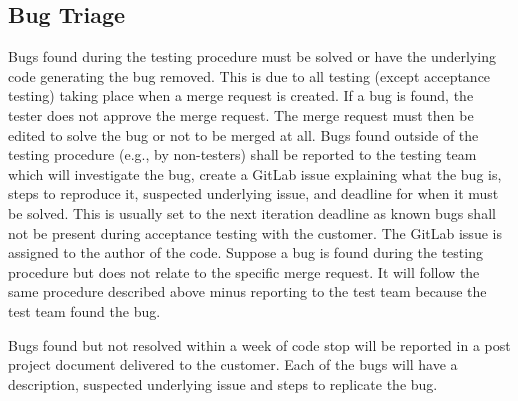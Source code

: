 \subsection{Bug Triage}
Bugs found during the testing procedure must be solved or have the underlying code generating the bug removed. This is due to all testing (except acceptance testing) taking place when a merge request is created. If a bug is found, the tester does not approve the merge request. The merge request must then be edited to solve the bug or not to be merged at all. Bugs found outside of the testing procedure (e.g., by non-testers) shall be reported to the testing team which will investigate the bug, create a GitLab issue explaining what the bug is, steps to reproduce it, suspected underlying issue, and deadline for when it must be solved. This is usually set to the next iteration deadline as known bugs shall not be present during acceptance testing with the customer. The GitLab issue is assigned to the author of the code. Suppose a bug is found during the testing procedure but does not relate to the specific merge request. It will follow the same procedure described above minus reporting to the test team because the test team found the bug. \newline

\noindent Bugs found but not resolved within a week of code stop will be reported in a post project document delivered to the customer. Each of the bugs will have a description, suspected underlying issue and steps to replicate the bug.

